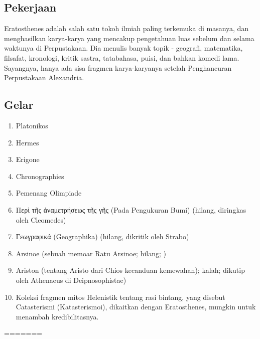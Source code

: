 \subsection{Pekerjaan}
Eratosthenes adalah salah satu tokoh ilmiah paling terkemuka di masanya, dan menghasilkan karya-karya yang mencakup pengetahuan luas sebelum dan selama waktunya di Perpustakaan. Dia menulis banyak topik - geografi, matematika, filsafat, kronologi, kritik sastra, tatabahasa, puisi, dan bahkan komedi lama. Sayangnya, hanya ada sisa fragmen karya-karyanya setelah Penghancuran Perpustakaan Alexandria.
\subsection{Gelar}
\begin{enumerate}

\item	Platonikos
\item	Hermes
\item	Erigone
\item	Chronographies
\item	Pemenang Olimpiade
\item	 Περὶ τῆς ἀναμετρήσεως τῆς γῆς (Pada Pengukuran Bumi) (hilang, diringkas oleh Cleomedes) \cite{thomasselections}
\item	Гεωγραφικά (Geographika) (hilang, dikritik oleh Strabo)
\item	Arsinoe (sebuah memoar Ratu Arsinoe; hilang; \cite{gulickathenaeus})
\item	 Ariston (tentang Aristo dari Chios kecanduan kemewahan); kalah; dikutip oleh Athenaeus di Deipnosophistae) \cite{gulickathenaeus}
\item	Koleksi fragmen mitos Helenistik tentang rasi bintang, yang disebut Catasterismi (Katasterismoi), dikaitkan dengan Eratosthenes, mungkin untuk menambah kredibilitasnya.
\end{enumerate}
=======


